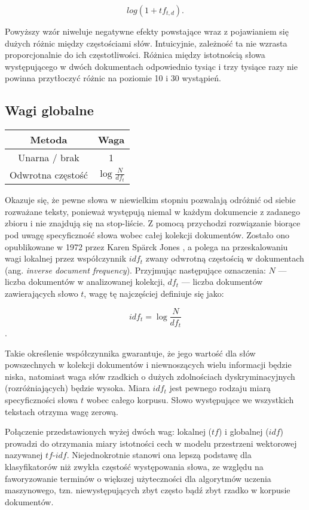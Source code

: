 \documentclass{pracamgr}
\begin{document}
\[
log(1 + tf_{t,d}).
\]

Powyższy wzór niweluje negatywne efekty powstające wraz z pojawianiem się dużych różnic między częstościami słów. Intuicyjnie, zależność ta nie wzrasta proporcjonalnie do ich częstotliwości. Różnica między istotnością słowa występującego w dwóch dokumentach odpowiednio tysiąc i trzy tysiące razy nie powinna przytłoczyć różnic na poziomie 10 i 30 wystąpień.

\subsection{Wagi globalne}
\vspace{3mm}

\begin{tabular}{|c|c|}
     Metoda & Waga \\ \hline
     Unarna / brak & 1 \\[0.25cm] 
     Odwrotna częstość & $ \log\displaystyle\frac{N}{df_t} $ \\[0.25cm]
\end{tabular}
\vspace{5mm}

Okazuje się, że pewne słowa w niewielkim stopniu pozwalają odróżnić od siebie rozważane teksty, ponieważ występują niemal w każdym dokumencie z zadanego zbioru i nie znajdują się na stop-liście. Z pomocą przychodzi rozwiązanie biorące pod uwagę specyficzność słowa wobec całej kolekcji dokumentów. Zostało ono opublikowane w 1972 przez Karen Spärck Jones \cite{sparck}, a polega na przeskalowaniu wagi lokalnej przez współczynnik $idf_t$ zwany odwrotną częstością w dokumentach (ang. \textit{inverse document frequency}). Przyjmując następujące oznaczenia: $N$ --- liczba dokumentów w analizowanej kolekcji, $ df_t $ --- liczba dokumentów zawierających słowo $t$, wagę tę najczęściej definiuje się jako: 

\[ 
idf_t = \log\frac{N}{df_t}
\].

Takie określenie współczynnika gwarantuje, że jego wartość dla słów powszechnych w kolekcji dokumentów i niewnoszących wielu informacji będzie niska, natomiast waga słów rzadkich o dużych zdolnościach dyskryminacyjnych (rozróżniających) będzie wysoka. Miara $idf_t$ jest pewnego rodzaju miarą specyficzności słowa $t$ wobec całego korpusu. Słowo występujące we wszystkich tekstach otrzyma wagę zerową. 

Połączenie przedstawionych wyżej dwóch wag: lokalnej ($tf$) i globalnej ($idf$) prowadzi do otrzymania miary istotności cech w modelu przestrzeni wektorowej nazywanej $tf \text{-} idf$. Niejednokrotnie stanowi ona lepszą podstawę dla klasyfikatorów niż zwykła częstość występowania słowa, ze względu na faworyzowanie terminów o większej użyteczności dla algorytmów uczenia maszynowego, tzn. niewystępujących zbyt często bądź zbyt rzadko w korpusie dokumentów.
\end{document}

